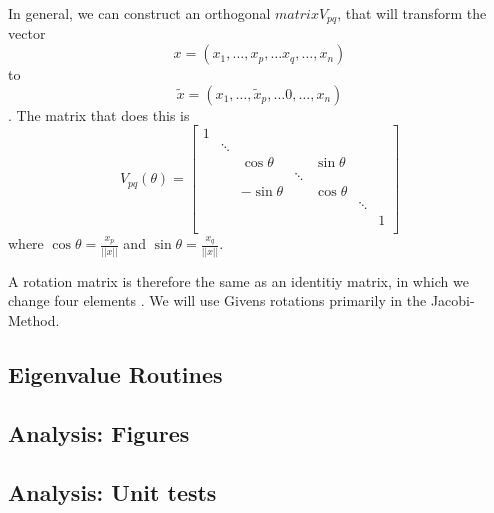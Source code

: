 \documentclass[12pt]{article}
\begin{document}
In general, we can construct an orthogonal $matrix V_{pq}$, that will transform the vector $$x = (x_1,\dots, x_p, \dots x_q, \dots, x_n)$$ to $$\tilde{x} = (x_1,\dots, \tilde{x}_p, \dots 0, \dots, x_n)$$. The matrix that does this is
\begin{equation}
\label{givens-rotation}
V_{pq}(\theta) = \begin{bmatrix}
                      1 \\
                        & \ddots \\
                        &        & \cos\theta    &        & \sin\theta  \\
                        &        &               & \ddots     \\
                        &        & -\sin\theta   &        & \cos\theta   \\
                        &        &               &        &            &  \ddots \\
                        &        &               &        &            &         & 1 \\                      
                 \end{bmatrix}
\end{equation}
	where $\cos\theta = \frac{x_p}{||x||}$ and $\sin\theta = \frac{x_q}{||x||}.$
	
A rotation matrix is therefore the same as an identitiy matrix, in which we change four elements \cite{NME}. We will use Givens rotations primarily in the Jacobi-Method.


\subsection{Eigenvalue Routines}
  
  
  \newpage
\subsection{Analysis: Figures}
  
  \newpage    
\subsection{Analysis: Unit tests}
  
  \newpage


\end{document}
